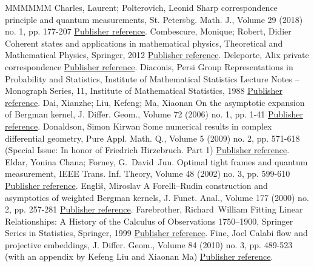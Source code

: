\begin{thebibliography}{MMMMMM}
 Charles, Laurent; Polterovich, Leonid Sharp correspondence principle and quantum measurements, St. Petersbg. Math. J., Volume 29 (2018) no. 1, pp. 177-207 \href{https://ahl.centre-mersenne.org/item/AHL_2020__3__1343_0/#CP}{Publisher reference}.
 Combescure, Monique; Robert, Didier Coherent states and applications in mathematical physics, Theoretical and Mathematical Physics, Springer, 2012 \href{https://ahl.centre-mersenne.org/item/AHL_2020__3__1343_0/#CR}{Publisher reference}.
 Deleporte, Alix private correspondence \href{https://ahl.centre-mersenne.org/item/AHL_2020__3__1343_0/#Deleporte}{Publisher reference}.
 Diaconis, Persi Group Representations in Probability and Statistics, Institute of Mathematical Statistics Lecture Notes – Monograph Series, 11, Institute of Mathematical Statistics, 1988 \href{https://ahl.centre-mersenne.org/item/AHL_2020__3__1343_0/#Diaconis}{Publisher reference}.
 Dai, Xianzhe; Liu, Kefeng; Ma, Xiaonan On the asymptotic expansion of Bergman kernel, J. Differ. Geom., Volume 72 (2006) no. 1, pp. 1-41 \href{https://ahl.centre-mersenne.org/item/AHL_2020__3__1343_0/#DLM06}{Publisher reference}.
 Donaldson, Simon Kirwan Some numerical results in complex differential geometry, Pure Appl. Math. Q., Volume 5 (2009) no. 2, pp. 571-618 (Special Issue: In honor of Friedrich Hirzebruch. Part 1) \href{https://ahl.centre-mersenne.org/item/AHL_2020__3__1343_0/#D}{Publisher reference}.
 Eldar, Yonina Chana; Forney, G. David Jun. Optimal tight frames and quantum measurement, IEEE Trans. Inf. Theory, Volume 48 (2002) no. 3, pp. 599-610 \href{https://ahl.centre-mersenne.org/item/AHL_2020__3__1343_0/#EF}{Publisher reference}.
 Engliš, Miroslav A Forelli–Rudin construction and asymptotics of weighted Bergman kernels, J. Funct. Anal., Volume 177 (2000) no. 2, pp. 257-281 \href{https://ahl.centre-mersenne.org/item/AHL_2020__3__1343_0/#E00}{Publisher reference}.
 Farebrother, Richard William Fitting Linear Relationships: A History of the Calculus of Observations 1750–1900, Springer Series in Statistics, Springer, 1999 \href{https://ahl.centre-mersenne.org/item/AHL_2020__3__1343_0/#Fare}{Publisher reference}.
 Fine, Joel Calabi flow and projective embeddings, J. Differ. Geom., Volume 84 (2010) no. 3, pp. 489-523 (with an appendix by Kefeng Liu and Xiaonan Ma) \href{https://ahl.centre-mersenne.org/item/AHL_2020__3__1343_0/#Fin10}{Publisher reference}.

\end{thebibliography}
